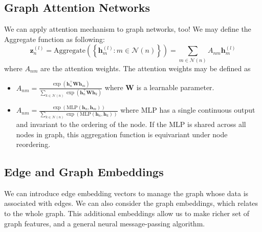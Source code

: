 \documentclass{article}
\begin{document}
    \subsection{Graph Attention Networks}
        We can apply attention mechanism to graph networks, too! We may define the Aggregate function as following:
        \[
        \textbf{z}_n^{(l)}=\text{Aggregate}\left( \left\{ \textbf{h}_m^{(l)}:m \in \mathcal N(n) \right\} \right)
        =\sum_{m \in \mathcal N(n)} A_{nm}\textbf{h}_m^{(l)}
        \]
        where $A_{nm}$ are the attention weights.
        The attention weights may be defined as
        \begin{itemize}
            \item $\displaystyle{A_{nm}=\frac{\exp{(\textbf{h}_n^{\top}\textbf{W}\textbf{h}_m)}}{\sum_{k \in \mathcal N(n)}\exp{(\textbf{h}_n^{\top}\textbf{W}\textbf{h}_k)}}}$
                where \textbf{W} is a learnable parameter.
            \item $\displaystyle{A_{nm}=\frac{\exp{(\text{MLP}(\textbf{h}_n, \textbf{h}_m))}}{\sum_{k \in \mathcal N(n)}\exp{(\text{MLP}(\textbf{h}_n, \textbf{h}_k))}}}$
                where MLP has a single continuous output and invariant to the ordering of the node. If the MLP is shared across all nodes in graph, this aggregation function is equivariant under node reordering.
        \end{itemize}
    \subsection{Edge and Graph Embeddings}
        We can introduce edge embedding vectors to manage the graph whose data is associated with edges. We can also consider the graph embeddings, which relates to the whole graph.
        This additional embeddings allow us to make richer set of graph features, and a general neural message-passing algorithm.
\end{document}

